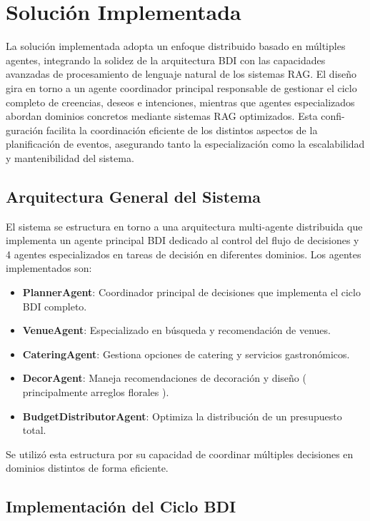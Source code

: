 \documentclass[runningheads,a4paper]{llncs}
\begin{document}
\section{Solución Implementada}

La solución implementada adopta un enfoque distribuido basado en múltiples agentes, integrando la solidez de la arquitectura BDI 
con las capacidades avanzadas de procesamiento de lenguaje natural de los sistemas RAG. El diseño gira en torno a un agente 
coordinador principal responsable de gestionar el ciclo completo de creencias, deseos e intenciones, mientras que agentes 
especializados abordan dominios concretos mediante sistemas RAG optimizados. Esta confi-guración facilita la coordinación eficiente 
de los distintos aspectos de la planificación de eventos, asegurando tanto la especialización como la escalabilidad y mantenibilidad 
del sistema.

\subsection{Arquitectura General del Sistema}

El sistema se estructura en torno a una arquitectura multi-agente distribuida que implementa un agente principal BDI dedicado 
al control del flujo de decisiones y 4 agentes especializados en tareas de decisión en diferentes dominios. Los agentes 
implementados son:

\begin{itemize}
    \item \textbf{PlannerAgent}: Coordinador principal de decisiones que implementa el ciclo BDI completo.
    \item \textbf{VenueAgent}: Especializado en búsqueda y recomendación de venues.
    \item \textbf{CateringAgent}: Gestiona opciones de catering y servicios gastronómicos.
    \item \textbf{DecorAgent}: Maneja recomendaciones de decoración y diseño ( principalmente arreglos florales ).
    \item \textbf{BudgetDistributorAgent}: Optimiza la distribución de un presupuesto total.
\end{itemize}

Se utilizó esta estructura por su capacidad de coordinar múltiples decisiones en dominios distintos de forma eficiente.

\subsection{Implementación del Ciclo BDI}
\end{document}
